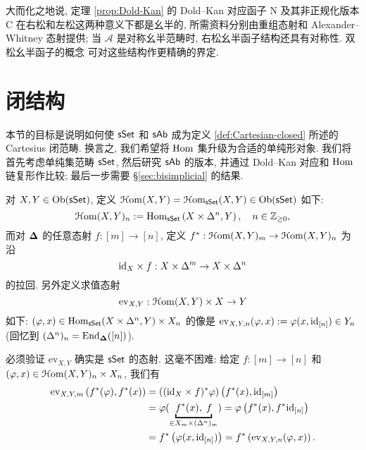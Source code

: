 \begin{remark}[幺半结构]
	大而化之地说, 定理 \ref{prop:Dold-Kan} 的 Dold--Kan 对应函子 $\mathrm{N}$ 及其非正规化版本 $\mathrm{C}$ 在右松和左松这两种意义下都是幺半的, 所需资料分别由重组态射和 Alexander--Whitney 态射提供; 当 $\mathcal{A}$ 是对称幺半范畴时, 右松幺半函子结构还具有对称性. 双松幺半函子的概念 \cite[Chapters 3, 5]{AM10} 可对这些结构作更精确的界定.
	
\end{remark}

\section{闭结构}\label{sec:closed-simplicial}
本节的目标是说明如何使 $\mathsf{sSet}$ 和 $\mathsf{sAb}$ 成为定义 \ref{def:Cartesian-closed} 所述的 Cartesius 闭范畴. 换言之, 我们希望将 $\operatorname{Hom}$ 集升级为合适的单纯形对象. 我们将首先考虑单纯集范畴 $\mathsf{sSet}$, 然后研究 $\mathsf{sAb}$ 的版本, 并通过 Dold--Kan 对应和 $\operatorname{Hom}$ 链复形作比较; 最后一步需要 \S\ref{sec:bisimplicial} 的结果.

\begin{definition}\label{def:internal-Hom-sSet}
	对 $X, Y \in \operatorname{Ob}(\mathsf{sSet})$, 定义 $\EuScript{H}\mathrm{om}(X, Y) = \EuScript{H}\mathrm{om}_{\mathsf{sSet}}(X, Y) \in \operatorname{Ob}(\mathsf{sSet})$ 如下:
	\[ \EuScript{H}\mathrm{om}(X, Y)_n := \operatorname{Hom}_{\mathsf{sSet}}\left( X \times \Delta^n, Y \right), \quad n \in \mathbb{Z}_{\geq 0}, \]
	而对 $\bm\Delta$ 的任意态射 $f: [m] \to [n]$, 定义 $f^*: \EuScript{H}\mathrm{om}(X, Y)_m \to \EuScript{H}\mathrm{om}(X, Y)_n$ 为沿
	\[ \mathrm{id}_X \times f : X \times \Delta^m \to X \times \Delta^n \]
	的拉回. 另外定义求值态射
	\[ \mathrm{ev}_{X, Y}: \EuScript{H}\mathrm{om}(X, Y) \times X \to Y \]
	如下: $(\varphi, x) \in \operatorname{Hom}_{\mathsf{sSet}}(X \times \Delta^n, Y) \times X_n$ 的像是 $\mathrm{ev}_{X, Y, n}(\varphi, x) := \varphi(x, \mathrm{id}_{[n]}) \in Y_n$ (回忆到 $(\Delta^n)_n = \operatorname{End}_{\bm\Delta}([n])$).
\end{definition}

必须验证 $\mathrm{ev}_{X, Y}$ 确实是 $\mathsf{sSet}$ 的态射. 这毫不困难: 给定 $f: [m] \to [n]$ 和 $(\varphi, x) \in \EuScript{H}\mathrm{om}(X, Y)_n \times X_n$, 我们有
\begin{align*}
	\mathrm{ev}_{X, Y, m} \left( f^*(\varphi), f^*(x) \right) & = ((\identity_X \times f)^* \varphi)\left( f^*(x), \identity_{[m]} \right) \\
	& = \varphi(\underbracket{f^*(x), \; f}_{\in X_m \times (\Delta^n)_m }) = \varphi\left( f^*(x), f^* \identity_{[n]} \right) \\
	& = f^*\left( \varphi(x, \identity_{[n]}) \right) = f^* \left(\mathrm{ev}_{X, Y, n}(\varphi, x)\right).
\end{align*}


